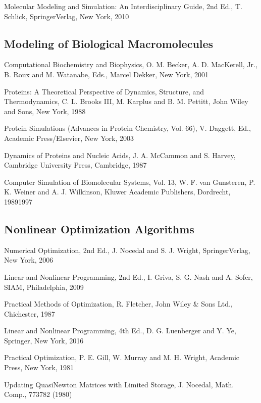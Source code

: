 \documentclass[letterpaper,11pt,english]{sphinxmanual}
\begin{document}
\sphinxAtStartPar
Molecular Modeling and Simulation: An Interdisciplinary Guide, 2nd Ed., T. Schlick, Springer\sphinxhyphen{}Verlag, New York, 2010


\subsection{Modeling of Biological Macromolecules}
\label{\detokenize{text/references:modeling-of-biological-macromolecules}}
\sphinxAtStartPar
Computational Biochemistry and Biophysics, O. M. Becker, A. D. MacKerell, Jr., B. Roux and M. Watanabe, Eds., Marcel Dekker, New York, 2001

\sphinxAtStartPar
Proteins: A Theoretical Perspective of Dynamics, Structure, and Thermodynamics, C. L. Brooks III, M. Karplus and B. M. Pettitt, John Wiley and Sons, New York, 1988

\sphinxAtStartPar
Protein Simulations (Advances in Protein Chemistry, Vol. 66), V. Daggett, Ed., Academic Press/Elsevier, New York, 2003

\sphinxAtStartPar
Dynamics of Proteins and Nucleic Acids, J. A. McCammon and S. Harvey, Cambridge University Press, Cambridge, 1987

\sphinxAtStartPar
Computer Simulation of Biomolecular Systems, Vol. 1\sphinxhyphen{}3, W. F. van Gunsteren, P. K. Weiner and A. J. Wilkinson, Kluwer Academic Publishers, Dordrecht, 1989\sphinxhyphen{}1997


\subsection{Nonlinear Optimization Algorithms}
\label{\detokenize{text/references:nonlinear-optimization-algorithms}}
\sphinxAtStartPar
Numerical Optimization, 2nd Ed., J. Nocedal and S. J. Wright, Springer\sphinxhyphen{}Verlag, New York, 2006

\sphinxAtStartPar
Linear and Nonlinear Programming, 2nd Ed., I. Griva, S. G. Nash and A. Sofer, SIAM, Philadelphia, 2009

\sphinxAtStartPar
Practical Methods of Optimization, R. Fletcher, John Wiley \& Sons Ltd., Chichester, 1987

\sphinxAtStartPar
Linear and Nonlinear Programming, 4th Ed., D. G. Luenberger and Y. Ye, Springer, New York, 2016

\sphinxAtStartPar
Practical Optimization, P. E. Gill, W. Murray and M. H. Wright, Academic Press, New York, 1981

\sphinxAtStartPar
Updating Quasi\sphinxhyphen{}Newton Matrices with Limited Storage, J. Nocedal, Math. Comp., 773\sphinxhyphen{}782 (1980)
\end{document}
